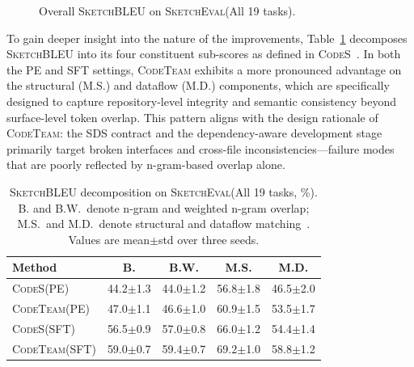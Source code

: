 \documentclass[format=acmsmall, review=false, screen=true]{acmart}
\newcommand{\tool}{\textsc{CodeTeam}\xspace}
\newcommand{\codes}{\textsc{CodeS}\xspace}
\newcommand{\sketcheval}{\textsc{SketchEval}\xspace}
\newcommand{\sketchbleu}{\textsc{SketchBLEU}\xspace}
\begin{document}
\begin{figure}[t]
\centering
{}
\caption{Overall \sketchbleu on \sketcheval (All 19 tasks).}
\label{fig:rq1-overall}
\end{figure}



To gain deeper insight into the nature of the improvements, Table~\ref{tab:rq1-decomp} decomposes \sketchbleu into its four constituent sub-scores as defined in \codes~\cite{Zan2025CodeS}.
In both the PE and SFT settings, \tool exhibits a more pronounced advantage on the structural (M.S.) and dataflow (M.D.) components, which are specifically designed to capture repository-level integrity and semantic consistency beyond surface-level token overlap.
This pattern aligns with the design rationale of \tool: the SDS contract and the dependency-aware development stage primarily target broken interfaces and cross-file inconsistencies---failure modes that are poorly reflected by n-gram-based overlap alone.

\begin{table}[t]
\centering
\small
\caption{\sketchbleu decomposition on \sketcheval (All 19 tasks, \%). B. and B.W.\ denote n-gram and weighted n-gram overlap; M.S.\ and M.D.\ denote structural and dataflow matching~\cite{Zan2025CodeS}. Values are mean$\pm$std over three seeds.}
\label{tab:rq1-decomp}
\begin{tabular}{@{}lcccc@{}}
\toprule
Method & B. & B.W. & M.S. & M.D. \\
\midrule
\codes (PE) & 44.2{\scriptsize$\pm$1.3} & 44.0{\scriptsize$\pm$1.2} & 56.8{\scriptsize$\pm$1.8} & 46.5{\scriptsize$\pm$2.0} \\
\tool (PE) & 47.0{\scriptsize$\pm$1.1} & 46.6{\scriptsize$\pm$1.0} & 60.9{\scriptsize$\pm$1.5} & 53.5{\scriptsize$\pm$1.7} \\
\midrule
\codes (SFT) & 56.5{\scriptsize$\pm$0.9} & 57.0{\scriptsize$\pm$0.8} & 66.0{\scriptsize$\pm$1.2} & 54.4{\scriptsize$\pm$1.4} \\
\tool (SFT) & 59.0{\scriptsize$\pm$0.7} & 59.4{\scriptsize$\pm$0.7} & 69.2{\scriptsize$\pm$1.0} & 58.8{\scriptsize$\pm$1.2} \\
\bottomrule
\end{tabular}
\end{table}
\end{document}
